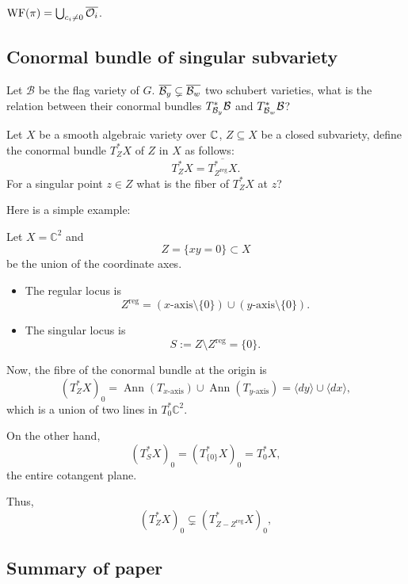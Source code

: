 $\mathrm{WF}(\pi) = \bigcup_{c_i \neq 0} \overline{\mathcal{O}_i}$.





\subsection{Conormal bundle of singular subvariety}

Let $\mathcal{B}$ be the flag variety of $G$. $\overline{\mathcal{B}_y} \subsetneq \overline{\mathcal{B}_w}$ two schubert varieties, what is the relation between their conormal bundles $T^*_{\mathcal{B}_y}\mathcal{B}$ and $T^*_{\mathcal{B}_w}\mathcal{B}$?

Let $X$ be a smooth algebraic variety over $\mathbb{C}$, $Z \subseteq X$ be a closed subvariety, define the conormal bundle $T^*_Z X$ of $Z$ in $X$ as follows:
\[T^*_Z X = \overline{T^*_{Z^{\mathrm{reg}}}X} .\]
For a singular point $z \in Z$ what is the fiber of $T^*_Z X$ at $z$?

Here is a simple example:
\begin{examp}Let \(X = \mathbb{C}^2\) and
\[
Z = \{ xy = 0 \} \subset X
\]
be the union of the coordinate axes.

\begin{itemize}
    \item The regular locus is
    \[
    Z^{\mathrm{reg}} = (x\text{-axis} \setminus \{0\}) \cup (y\text{-axis} \setminus \{0\}).
    \]
    \item The singular locus is
    \[
    S := Z \setminus Z^{\mathrm{reg}} = \{0\}.
    \]
\end{itemize}

Now, the fibre of the conormal bundle at the origin is
\[
(T^*_Z X)_0 = \operatorname{Ann}(T_{x\text{-axis}}) \cup \operatorname{Ann}(T_{y\text{-axis}}) = \langle dy \rangle \cup \langle dx \rangle,
\]
which is a union of two lines in \(T^*_0 \mathbb{C}^2\).

On the other hand,
\[
(T^*_{S} X)_0 = (T^*_{\{0\}} X)_0 = T^*_0 X,
\]
the entire cotangent plane.

Thus,
\[
(T^*_Z X)_0 \subsetneq (T^*_{Z - Z^{\mathrm{reg}}} X)_0,
\]

\end{examp}


\subsection{Summary of paper \cite[The characteristic cycles of holonomic systems on a flag manifold]{KT84}}


